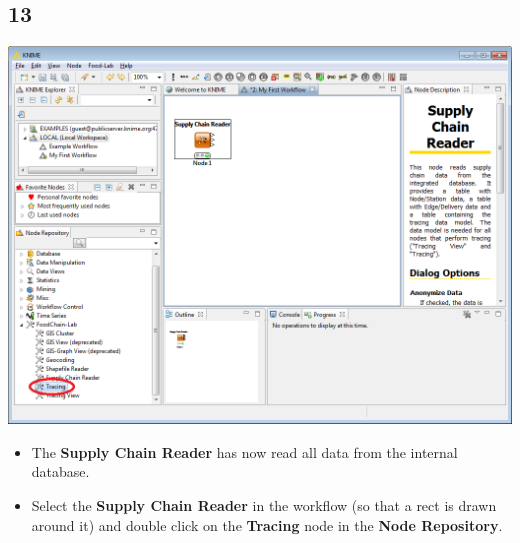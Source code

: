 \documentclass{beamer}
\begin{document}
\subsection{13}
\begin{frame}
	\begin{center}
  		\includegraphics[height=0.6\textheight]{13.png}
	\end{center}
	\begin{itemize}
		\item The \textbf{Supply Chain Reader} has now read all data from the internal database.
		\item Select the \textbf{Supply Chain Reader} in the workflow (so that a rect is drawn around it) and double click on the \textbf{Tracing} node in the \textbf{Node Repository}.
	\end{itemize}
\end{frame}
\end{document}
